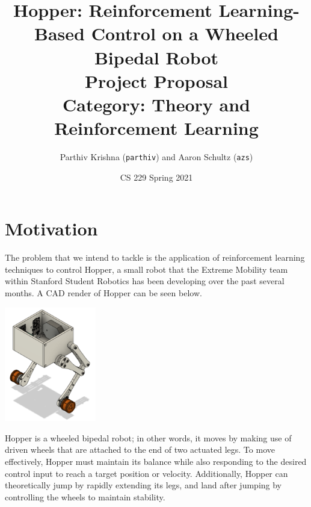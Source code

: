 \documentclass[12pt]{article}
\title{Hopper: Reinforcement Learning-Based Control on a Wheeled Bipedal Robot \\\large Project Proposal \\ Category: Theory and Reinforcement Learning}
\author{Parthiv Krishna (\texttt{parthiv}) and Aaron Schultz (\texttt{azs})}
\date{CS 229 Spring 2021}
\begin{document}


\graphicspath{ {.} }

\maketitle

\section{Motivation}
The problem that we intend to tackle is the application of reinforcement learning techniques to control Hopper, a small robot that the Extreme Mobility team within Stanford Student Robotics has been developing over the past several months. A CAD render of Hopper can be seen below.

\begin{center}
\includegraphics[width=0.3\textwidth]{hopper}
\end{center}

Hopper is a wheeled bipedal robot; in other words, it moves by making use of driven wheels that are attached to the end of two actuated legs. To move effectively, Hopper must maintain its balance while also responding to the desired control input to reach a target position or velocity. Additionally, Hopper can theoretically jump by rapidly extending its legs, and land after jumping by controlling the wheels to maintain stability. 
\end{document}
